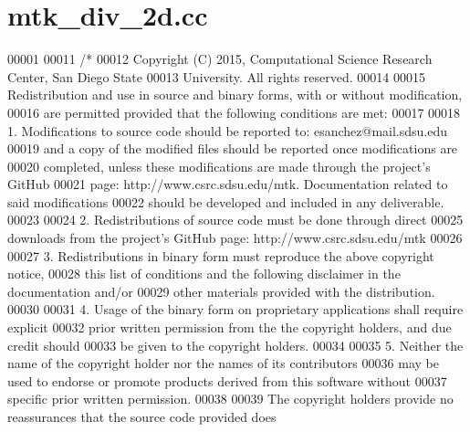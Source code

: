 \hypertarget{mtk__div__2d_8cc_source}{\section{mtk\+\_\+div\+\_\+2d.\+cc}
\label{mtk__div__2d_8cc_source}
}

\begin{DoxyCode}
00001 
00011 \textcolor{comment}{/*}
00012 \textcolor{comment}{Copyright (C) 2015, Computational Science Research Center, San Diego State}
00013 \textcolor{comment}{University. All rights reserved.}
00014 \textcolor{comment}{}
00015 \textcolor{comment}{Redistribution and use in source and binary forms, with or without modification,}
00016 \textcolor{comment}{are permitted provided that the following conditions are met:}
00017 \textcolor{comment}{}
00018 \textcolor{comment}{1. Modifications to source code should be reported to: esanchez@mail.sdsu.edu}
00019 \textcolor{comment}{and a copy of the modified files should be reported once modifications are}
00020 \textcolor{comment}{completed, unless these modifications are made through the project's GitHub}
00021 \textcolor{comment}{page: http://www.csrc.sdsu.edu/mtk. Documentation related to said modifications}
00022 \textcolor{comment}{should be developed and included in any deliverable.}
00023 \textcolor{comment}{}
00024 \textcolor{comment}{2. Redistributions of source code must be done through direct}
00025 \textcolor{comment}{downloads from the project's GitHub page: http://www.csrc.sdsu.edu/mtk}
00026 \textcolor{comment}{}
00027 \textcolor{comment}{3. Redistributions in binary form must reproduce the above copyright notice,}
00028 \textcolor{comment}{this list of conditions and the following disclaimer in the documentation and/or}
00029 \textcolor{comment}{other materials provided with the distribution.}
00030 \textcolor{comment}{}
00031 \textcolor{comment}{4. Usage of the binary form on proprietary applications shall require explicit}
00032 \textcolor{comment}{prior written permission from the the copyright holders, and due credit should}
00033 \textcolor{comment}{be given to the copyright holders.}
00034 \textcolor{comment}{}
00035 \textcolor{comment}{5. Neither the name of the copyright holder nor the names of its contributors}
00036 \textcolor{comment}{may be used to endorse or promote products derived from this software without}
00037 \textcolor{comment}{specific prior written permission.}
00038 \textcolor{comment}{}
00039 \textcolor{comment}{The copyright holders provide no reassurances that the source code provided does}

\end{DoxyCode}
